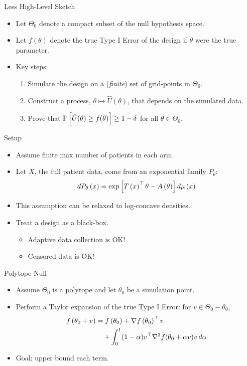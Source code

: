 \begin{frame}{Less High-Level Sketch}
\begin{itemize}
\item Let $\Theta_0$ denote a compact subset of the null
    hypothesis space.
\item Let $f(\theta)$ denote the true Type I Error of the design
    if $\theta$ were the true parameter.
\item Key steps: 
\begin{enumerate}
    \item Simulate the design on a (\emph{finite}) set of grid-points
        in $\Theta_0$.
    \item Construct a process, $\theta \mapsto \hat{U}(\theta)$, 
    that depends on the simulated data.
    \item Prove that $\mathbb{P}\left[\hat{U}(\theta) \geq f(\theta)\right] \geq 1-\delta$ for all $\theta \in \Theta_0$.
    
\end{enumerate}

\end{itemize}
\end{frame}

\begin{frame}{Setup}
\begin{itemize}
    \item Assume finite max number of patients in each arm.
    \item Let $X$, the full patient data, come from an exponential family $P_{\theta}$:
    \begin{align*}
        dP_\theta\left( x \right) = \exp\left[T\left( x \right)^\top \theta - A\left( \theta \right)\right] d\mu\left( x \right)
    \end{align*}
    \item This assumption can be relaxed to log-concave densities.
    \item Treat a design as a black-box.
    \begin{itemize}
        \item Adaptive data collection is OK!\@
        \item Censored data is OK!\@
    \end{itemize}
\end{itemize}
\end{frame}

\begin{frame}{Polytope Null}
\begin{itemize}
    \item Assume $\Theta_0$ is a polytope and let $\theta_0$ be a simulation point. 
    \item Perform a Taylor expansion of the true Type I Error: for $v \in \Theta_0-\theta_0$,
        \begin{align*}
            f\left( \theta_0 + v \right) &= f\left( \theta_0 \right) + \nabla f\left( \theta_0 \right)^\top v 
            \\&\quad + \int_0^1 (1-\alpha) v^\top \nabla^2 f(\theta_0 + \alpha v) v \, d\alpha
        \end{align*}
    \item Goal: upper bound each term.
\end{itemize}
\end{frame}

